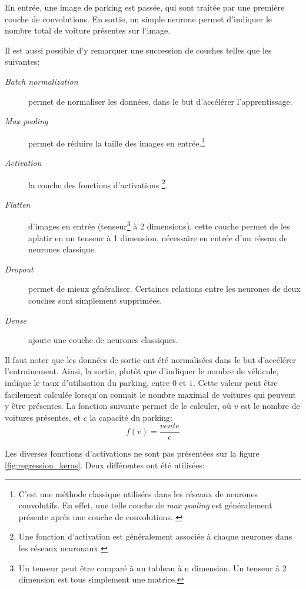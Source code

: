 En entrée, une image de parking est passée, qui sont traitée par une première couche de convolutions. En sortie, un simple neurone permet d'indiquer le nombre total de voiture présentes sur l'image. 


Il est aussi possible d'y remarquer une succession de couches telles que les suivantes:

\begin{description}
    \item[\textit{Batch normalization}] permet de normaliser les données, dans le but d'accélérer l'apprentissage.
    \item[\textit{Max pooling}] permet de réduire la taille des images en entrée.\footnote{C'est une méthode classique utilisées dans les réseaux de neurones convolutifs. En effet, une telle couche de \textit{max pooling} est généralement présente après une couche de convolutions. \autocite{wiki:CNN}} 
    \item[\textit{Activation}] la couche des fonctions d'activations \footnote{Une fonction d'activation est généralement associée à chaque neurones dans les réseaux neuronaux \autocite{wiki:NN}}. 
    \item[\textit{Flatten}] d'images en entrée (tenseur\footnote{Un tenseur peut être comparé à un tableau à n dimension. Un tenseur à 2 dimension est tous simplement une matrice. } à 2 dimensions), cette couche permet de les aplatir en un tenseur à 1 dimension, nécessaire en entrée d'un réseau de neurones classique.
    \item[\textit{Dropout}] permet de mieux généraliser. Certaines relations entre les neurones de deux couches sont simplement supprimées.
    \item[\textit{Dense}] ajoute une couche de neurones classiques. 
\end{description}

Il faut noter que les données de sortie ont été normalisées dans le but d'accélérer l'entrainement. Ainsi, la sortie, plutôt que d'indiquer le nombre de véhicule, indique le taux d'utilisation du parking, entre $0$ et $1$. Cette valeur peut être facilement calculée lorsqu'on connait le nombre maximal de voitures qui peuvent y être présentes. La fonction suivante permet de le calculer, où $v$ est le nombre de voitures présentes, et $c$ la capacité du parking:
\[
    f(v) = \frac{vente}{c}
\]

Les diverses fonctions d'activations ne sont pas présentées sur la figure \ref{fig:regression_keras}. Deux différentes ont été utilisées:

